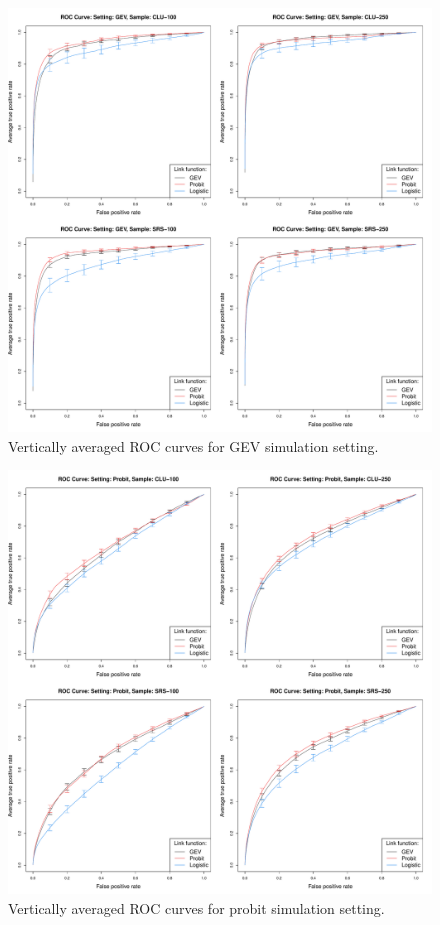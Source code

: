 \begin{figure}
  \includegraphics[width=\linewidth]{plots/sim-perf-gev}
  \caption{Vertically averaged ROC curves for GEV simulation setting.}
  \label{rbfig:simrocgev}
\end{figure}

\begin{figure}
  \includegraphics[width=\linewidth]{plots/sim-perf-probit}
  \caption{Vertically averaged ROC curves for probit simulation setting.}
  \label{rbfig:simrocpro}
\end{figure}

